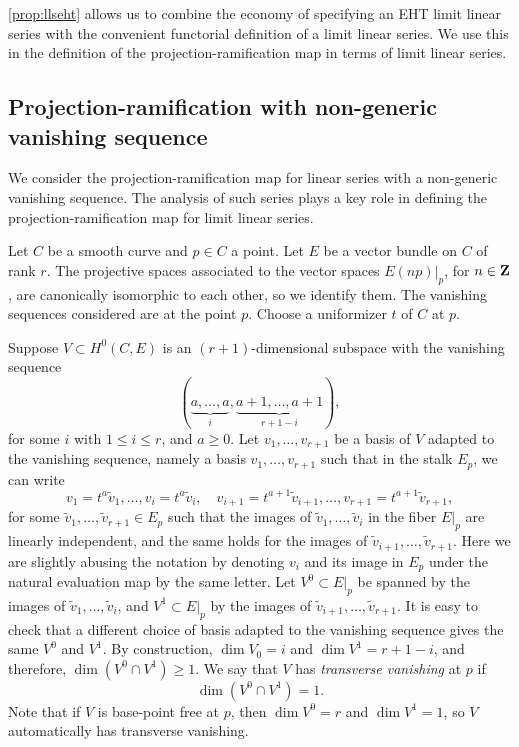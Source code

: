\documentclass[11pt,reqno]{amsart}
\theoremstyle{plain}
\theoremstyle{definition}
\theoremstyle{remark}
\numberwithin{equation}{section}
\numberwithin{equation}{section}
\begin{document}
\autoref{prop:llseht} allows us to combine the economy of specifying an EHT limit linear series with the convenient functorial definition of a limit linear series.
We use this in the definition of the projection-ramification map in terms of limit linear series.

\subsection{Projection-ramification with non-generic vanishing sequence}
\label{sec:prnongeneric}
We consider the projection-ramification map for linear series with a non-generic vanishing sequence.
The analysis of such series plays a key role in defining the projection-ramification map for limit linear series.

Let $C$ be a smooth curve and $p \in C$ a point.
Let $E$ be a vector bundle on $C$ of rank $r$.
The projective spaces associated to the vector spaces $E(np)|_p$, for $n \in {\bf Z}$, are canonically isomorphic to each other, so we identify them.
The vanishing sequences considered are at the point $p$.
Choose a uniformizer $t$ of $C$ at $p$.

Suppose $V \subset H^0(C, E)$ is an $(r+1)$-dimensional subspace with the vanishing sequence 
\begin{equation}\label{eqn:specialvs}
  (\underbrace{a, \dots, a}_{i}, \underbrace{a+1, \dots, a+1}_{r+1-i}),
\end{equation}
for some $i$ with $1 \leq i \leq r$, and $a \geq 0$.
Let $v_1, \dots, v_{r+1}$ be a basis of $V$ adapted to the vanishing sequence, namely a basis $v_1, \dots, v_{r+1}$ such that in the stalk $E_p$, we can write
\begin{equation}\label{eqn:basis}
  v_1 = t^a \widetilde v_1, \dots, v_{i} = t^a \widetilde v_i,\quad v_{i+1} = t^{a+1} \widetilde v_{i+1}, \dots, v_{r+1} = t^{a+1} \widetilde v_{r+1},
\end{equation}
for some $\widetilde v_1, \dots, \widetilde v_{r+1} \in E_p$ such that the images of $\widetilde v_1, \dots, \widetilde v_i$ in the fiber $E|_p$ are linearly independent, and the same holds for the images of $\widetilde v_{i+1}, \dots, \widetilde v_{r+1}$.
Here we are slightly abusing the notation by denoting $v_i$ and its image in $E_p$ under the natural evaluation map by the same letter.
Let $V^0 \subset E|_p$ be spanned by the images of $\widetilde v_1, \dots, \widetilde v_i$, and $V^1 \subset E|_p$ by the images of $\widetilde v_{i+1}, \dots, \widetilde v_{r+1}$.
It is easy to check that a different choice of basis adapted to the vanishing sequence gives the same $V^0$ and $V^1$.
By construction, $\dim V_0 = i$ and $\dim V^1 = r+1-i$, and therefore, $\dim (V^0 \cap V^1) \geq 1$.
We say that $V$ has \emph{transverse vanishing} at $p$ if 
\begin{equation}\label{eq:genericity}
  \dim (V^0 \cap V^1) = 1.
\end{equation}
Note that if $V$ is base-point free at $p$, then $\dim V^0 = r$ and $\dim V^1 = 1$, so $V$ automatically has transverse vanishing.
\end{document}
